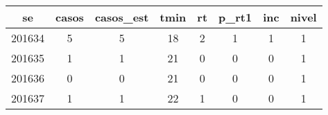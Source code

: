 \begin{tabular}{c|ccccccc}
  \hline
se & casos & casos\_est & tmin & rt & p\_rt1 & inc & nivel \\ 
  \hline
201634 & 5 & 5 & 18 & 2 & 1 & 1 & 1 \\ 
  201635 & 1 & 1 & 21 & 0 & 0 & 0 & 1 \\ 
  201636 & 0 & 0 & 21 & 0 & 0 & 0 & 1 \\ 
  201637 & 1 & 1 & 22 & 1 & 0 & 0 & 1 \\ 
   \hline
\end{tabular}
